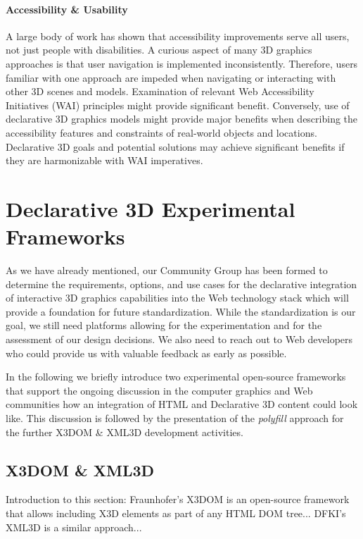 \documentclass[review]{acmsiggraph}
\begin{document}
\paragraph{Accessibility \& Usability}
A large body of work has shown that accessibility improvements serve all users, not just people with disabilities.  A curious aspect of many 3D graphics approaches is that user navigation is implemented inconsistently.  Therefore, users familiar with one approach are impeded when navigating or interacting with other 3D scenes and models.  Examination of relevant Web Accessibility Initiatives (WAI) principles might provide significant benefit.  Conversely, use of declarative 3D graphics models might provide major benefits when describing the accessibility features and constraints of real-world objects and locations.  Declarative 3D goals and potential solutions may achieve significant benefits if they are harmonizable with WAI imperatives.

\newpage

\section{Declarative 3D Experimental Frameworks}
\label{sec:Frameworks}
As we have already mentioned, our Community Group has been formed to determine the requirements, options, and use cases for the declarative integration of interactive 3D graphics capabilities into the Web technology stack which will provide a foundation for future standardization.
While the standardization is our goal, we still need platforms allowing for the experimentation and for the assessment of our design decisions. We also need to reach out to Web developers who could provide us with valuable feedback as early as possible.

In the following we briefly introduce two experimental open-source frameworks that support the ongoing discussion in the computer graphics and Web communities how an integration of HTML and Declarative 3D content could look like. This discussion is followed by the presentation of the \textit{polyfill} approach for the further X3DOM \& XML3D development activities.

\subsection{X3DOM \& XML3D}
Introduction to this section: Fraunhofer's X3DOM \cite{Behr2009} is an open-source framework that allows including X3D \cite{Web3D-X3D} elements as part of any HTML DOM tree... DFKI's XML3D \cite{Sons2010} is a similar approach...
\end{document}
